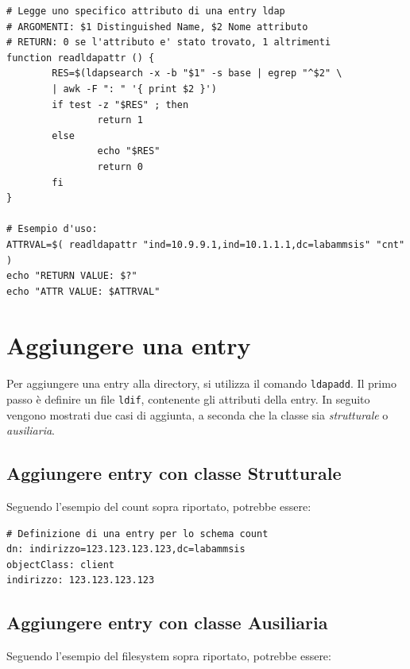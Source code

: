 \documentclass[a4paper]{report}
\newenvironment{funzioni}{\begin{tcolorbox}[fonttitle=\sffamily\bfseries\large,title=Funzioni Utili,colframe=darkgreen!75!white]}{\end{tcolorbox}}
\newenvironment{code}{\begin{tcolorbox}[size=small]}{\end{tcolorbox}}
\begin{document}
\begin{funzioni}
\begin{lstlisting}
# Legge uno specifico attributo di una entry ldap
# ARGOMENTI: $1 Distinguished Name, $2 Nome attributo
# RETURN: 0 se l'attributo e' stato trovato, 1 altrimenti
function readldapattr () {
        RES=$(ldapsearch -x -b "$1" -s base | egrep "^$2" \
        | awk -F ": " '{ print $2 }')
        if test -z "$RES" ; then
                return 1
        else
                echo "$RES"
                return 0
        fi
}

# Esempio d'uso:
ATTRVAL=$( readldapattr "ind=10.9.9.1,ind=10.1.1.1,dc=labammsis" "cnt" )
echo "RETURN VALUE: $?"
echo "ATTR VALUE: $ATTRVAL"
\end{lstlisting}
\end{funzioni}


\section{Aggiungere una entry}

Per aggiungere una entry alla directory, si utilizza il comando \texttt{ldapadd}. Il primo passo è definire un file \texttt{ldif}, contenente gli attributi della entry. In seguito vengono mostrati due casi di aggiunta, a seconda che la classe sia \textit{strutturale }o \textit{ausiliaria}.

\subsection{Aggiungere entry con classe Strutturale}

Seguendo l'esempio del count sopra riportato, potrebbe essere:

\begin{code}
\begin{lstlisting}
# Definizione di una entry per lo schema count
dn: indirizzo=123.123.123.123,dc=labammsis
objectClass: client
indirizzo: 123.123.123.123
\end{lstlisting}
\end{code}

\subsection{Aggiungere entry con classe Ausiliaria}

Seguendo l'esempio del filesystem sopra riportato, potrebbe essere:
\end{document}
